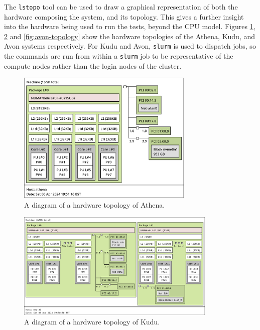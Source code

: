 The \texttt{lstopo} tool can be used to draw a graphical representation of both the hardware composing the system, and its topology. This gives a further insight into the hardware being used to run the tests, beyond the CPU model. Figures \ref{fig:athena-topology}, \ref{fig:kudu-topology} and \ref{fig:avon-topology} show the hardware topologies of the Athena, Kudu, and Avon systems respectively. For Kudu and Avon, \texttt{slurm} is used to dispatch jobs, so the commands are run from within a \texttt{slurm} job to be representative of the compute nodes rather than the login nodes of the cluster.

\begin{figure}[H]
    \centering
    \includegraphics[width=0.75\textwidth]{images/5_performance/athena-topology.png}
    \caption{A diagram of a hardware topology of Athena.}
    \label{fig:athena-topology}
\end{figure}

\begin{figure}[H]
    \centering
    \includegraphics[width=0.85\textwidth]{images/5_performance/kudu-topology.png}
    \caption{A diagram of a hardware topology of Kudu.}
    \label{fig:kudu-topology}
\end{figure}

